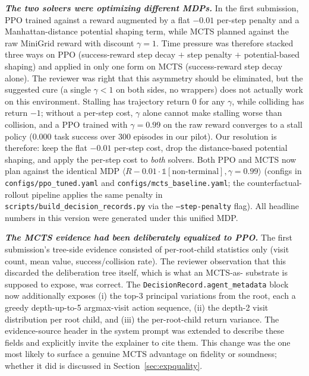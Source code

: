 \documentclass[conference]{IEEEtran}
\begin{document}
\textbf{\emph{The two solvers were optimizing different MDPs.}} In
the first submission, PPO trained against a reward augmented by a
flat $-0.01$ per-step penalty and a Manhattan-distance potential
shaping term, while MCTS planned against the raw MiniGrid reward with
discount $\gamma = 1$. Time pressure was therefore stacked three ways
on PPO (success-reward step decay $+$ step penalty $+$
potential-based shaping) and applied in only one form on MCTS
(success-reward step decay alone). The reviewer was right that this
asymmetry should be eliminated, but the suggested cure (a single
$\gamma < 1$ on both sides, no wrappers) does not actually work on
this environment. Stalling has trajectory return $0$ for any
$\gamma$, while colliding has return $-1$; without a per-step cost,
$\gamma$ alone cannot make stalling worse than collision, and a PPO
trained with $\gamma = 0.99$ on the raw reward converges to a stall
policy ($0.000$ task success over 300 episodes in our pilot). Our
resolution is therefore: keep the flat $-0.01$ per-step cost, drop
the distance-based potential shaping, and apply the per-step cost to
\emph{both} solvers. Both PPO and MCTS now plan against the
identical MDP $\langle R - 0.01 \cdot \mathbb{1}[\text{non-terminal}],
\gamma = 0.99 \rangle$ (configs in
\texttt{configs/ppo\_tuned.yaml} and
\texttt{configs/mcts\_baseline.yaml}; the counterfactual-rollout
pipeline applies the same penalty in
\texttt{scripts/build\_decision\_records.py} via the
\texttt{--step-penalty} flag). All headline numbers in this version
were generated under this unified MDP.

\textbf{\emph{The MCTS evidence had been deliberately equalized to
PPO.}} The first submission's tree-side evidence consisted of
per-root-child statistics only (visit count, mean value,
success/collision rate). The reviewer observation that this
discarded the deliberation tree itself, which is what an MCTS-as-
substrate is supposed to expose, was correct. The
\texttt{DecisionRecord.agent\_metadata} block now additionally
exposes (i) the top-3 principal variations from the root, each a
greedy depth-up-to-5 argmax-visit action sequence, (ii) the depth-2
visit distribution per root child, and (iii) the per-root-child
return variance. The evidence-source header in the system prompt was
extended to describe these fields and explicitly invite the explainer
to cite them. This change was the one most likely to surface a
genuine MCTS advantage on fidelity or soundness; whether it did is
discussed in Section~\ref{sec:expquality}.
\end{document}

